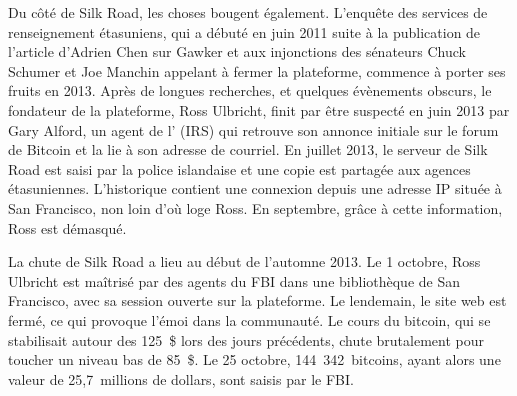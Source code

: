 Du côté de Silk Road, les choses bougent également. L'enquête des services de renseignement étasuniens, qui a débuté en juin 2011 suite à la publication de l'article d'Adrien Chen sur Gawker et aux injonctions des sénateurs Chuck Schumer et Joe Manchin appelant à fermer la plateforme, commence à porter ses fruits en 2013. Après de longues recherches, et quelques évènements obscurs, le fondateur de la plateforme, Ross Ulbricht, finit par être suspecté en juin 2013 par Gary Alford, un agent de l' (IRS) qui retrouve son annonce initiale sur le forum de Bitcoin et la lie à son adresse de courriel. En juillet 2013, le serveur de Silk Road est saisi par la police islandaise et une copie est partagée aux agences étasuniennes. L'historique contient une connexion depuis une adresse IP située à San Francisco, non loin d'où loge Ross. En septembre, grâce à cette information, Ross est démasqué.

La chute de Silk Road a lieu au début de l'automne 2013. Le 1\ier{} octobre, Ross Ulbricht est maîtrisé par des agents du FBI dans une bibliothèque de San Francisco, avec sa session ouverte sur la plateforme. Le lendemain, le site web est fermé, ce qui provoque l'émoi dans la communauté. Le cours du bitcoin, qui se stabilisait autour des 125~\$ lors des jours précédents, chute brutalement pour toucher un niveau bas de 85~\$. Le 25 octobre, 144~342~bitcoins, ayant alors une valeur de 25,7~millions de dollars, sont saisis par le FBI.

